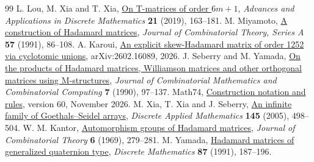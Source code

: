 \documentclass[10pt]{article}
\begin{document}
\begin{thebibliography}{99}
 L. Lou, M. Xia and T. Xia, \href{https://doi.org/10.17654/DM021020163}{On T-matrices of order $6m+1$}, \emph{Advances and Applications in Discrete Mathematics} \textbf{21} (2019), 163--181.
 M. Miyamoto, \href{https://www.sciencedirect.com/science/article/pii/0097316591900085}{A construction of Hadamard matrices}, \emph{Journal of Combinatorial Theory, Series A} \textbf{57} (1991), 86--108.
 A. Karoui, \href{https://arxiv.org/abs/2602.16089}{An explicit skew-Hadamard matrix of order 1252 via cyclotomic unions}, arXiv:2602.16089, 2026.
 J. Seberry and M. Yamada, \href{https://documents.uow.edu.au/~jennie/WEBPDF/139_1990.pdf}{On the products of Hadamard matrices, Williamson matrices and other orthogonal matrices using M-structures}, \emph{Journal of Combinatorial Mathematics and Combinatorial Computing} \textbf{7} (1990), 97--137.
 Math74, \href{https://www.math74.com/Hadamard/notation.html}{Construction notation and rules}, version 60, November 2026.
 M. Xia, T. Xia and J. Seberry, \href{https://documents.uow.edu.au/~jennie/WEBPDF/2005_06.pdf}{An infinite family of Goethals--Seidel arrays}, \emph{Discrete Applied Mathematics} \textbf{145} (2005), 498--504.
 W. M. Kantor, \href{https://darkwing.uoregon.edu/~kantor/PAPERS/AutHadMat.pdf}{Automorphism groups of Hadamard matrices}, \emph{Journal of Combinatorial Theory} \textbf{6} (1969), 279--281.
 M. Yamada, \href{https://doi.org/10.1016/0012-365X(91)90048-7}{Hadamard matrices of generalized quaternion type}, \emph{Discrete Mathematics} \textbf{87} (1991), 187--196.
\end{thebibliography}
\end{document}
